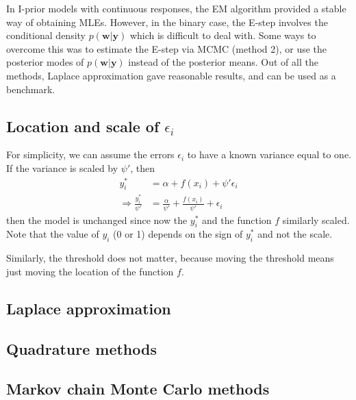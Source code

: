 In I-prior models with continuous responses, the EM algorithm provided a stable way of obtaining MLEs. However, in the binary case, the E-step involves the conditional density $p(\mathbf w|\mathbf y)$ which is difficult to deal with. Some ways to overcome this was to estimate the E-step via MCMC (method 2), or use the posterior modes of $p(\mathbf w|\mathbf y)$ instead of the posterior means. Out of all the methods, Laplace approximation gave reasonable results, and can be used as a benchmark. 


\subsection{Location and scale of $\epsilon_i$}

For simplicity, we can assume the errors $\epsilon_i$ to have a known variance equal to one. If the variance is scaled by $\psi'$, then
\begin{align*}
  y_i^* &= \alpha + f(x_i) + \psi'\epsilon_i \\
  \Rightarrow \frac{y_i^*}{\psi'} &= \frac{\alpha}{\psi'} + \frac{f(x_i)}{\psi'} + \epsilon_i
\end{align*}
then the model is unchanged since now the $y_i^*$ and the function $f$ similarly scaled. Note that the value of $y_i$ (0 or 1) depends on the sign of $y_i^*$ and not the scale.

Similarly, the threshold does not matter, because moving the threshold means just moving the location of the function $f$.

\subsection{Laplace approximation}


\subsection{Quadrature methods}


\subsection{Markov chain Monte Carlo methods}


